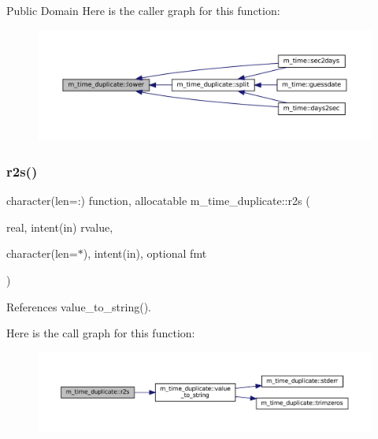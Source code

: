 Public Domain Here is the caller graph for this function\+:\nopagebreak
\begin{figure}[H]
\begin{center}
\leavevmode
\includegraphics[width=350pt]{namespacem__time__duplicate_af8b4555e0c47e2ec327f0434d84b9c56_icgraph}
\end{center}
\end{figure}
\mbox{\label{namespacem__time__duplicate_a9d1f96975ddf101c13c2f7f0dbf92a02}} 
\subsubsection{\texorpdfstring{r2s()}{r2s()}}
{\footnotesize\ttfamily character(len=\+:) function, allocatable m\+\_\+time\+\_\+duplicate\+::r2s (\begin{DoxyParamCaption}\item[{real, intent(in)}]{rvalue,  }\item[{character(len=$\ast$), intent(in), optional}]{fmt }\end{DoxyParamCaption})}



References value\+\_\+to\+\_\+string().

Here is the call graph for this function\+:\nopagebreak
\begin{figure}[H]
\begin{center}
\leavevmode
\includegraphics[width=350pt]{namespacem__time__duplicate_a9d1f96975ddf101c13c2f7f0dbf92a02_cgraph}
\end{center}
\end{figure}
\mbox{\label{namespacem__time__duplicate_a118f0d70fa6f319fbd773008c7f86ef9}} 
